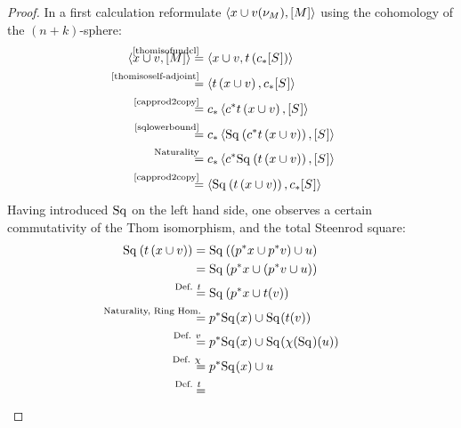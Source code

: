 \begin{Thm}
\begin{proof}
    
    In a first calculation reformulate
    $\left\langle x\cup v(\nu_{M}), [M] \right\rangle$ using the cohomology of the
    $(n+k)$-sphere:
    \begin{align}\notag
      \capped{x\cup \v}{\fundcl M}
      &\equalsby{\autoref{thomisofundcl}}
        \capped
        {x\cup\v}
        {\thomiso\left(\pf\collapse\fundcl{\Sphere{}}\right)}
      \\\notag
      &\equalsby{\autoref{thomisoself-adjoint}}
        \capped
        {\thomiso\left(x\cup\v\right)}
        {\pf\collapse\fundcl{\Sphere{}}}
      \\\notag
      &\equalsby{\autoref{capprod2copy}}
        \pf\collapse\capped
        {\pb\collapse\thomiso\left(x\cup\v\right)}
        {\fundcl{\Sphere{}}}
      \\\notag
      &\equalsby{\autoref{sqlowerbound}}
        \pf\collapse\capped
        {\Sq{}\left(\pb\collapse\thomiso\left(x\cup\v\right)\right)}
        {\fundcl{\Sphere{}}}
      \\\notag
      &\equalsby{Naturality}
        \pf\collapse\capped
        {\pb\collapse\Sq{}\left(\thomiso\left(x\cup\v\right)\right)}
        {\fundcl{\Sphere{}}}
      \\\label{proofaltdefwuclasses:eq1}
      &\equalsby{\autoref{capprod2copy}}
        \capped
        {\Sq{}\left(\thomiso\left(x\cup\v\right)\right)}
        {\pf\collapse\fundcl{\Sphere{}}}
    \end{align}
    Having introduced $\mathrm{Sq}^{}$ on the left hand side, one observes a
    certain commutativity of the Thom isomorphism, and the total
    Steenrod square:
    \begin{align}\notag
      \Sq{}\left(\thomiso\left(x\cup\v\right)\right)
      &=
        \Sq{}\left(\left(\pb p x\cup \pb p\v\right) \cup \u\right)
      \\\notag
      &=
        \Sq{}\left(\pb p x\cup \left(\pb p\v \cup \u\right)\right)
      \\\notag
      &\equalsby{Def. $\thomiso$}
       \Sq{}\left(\pb p x\cup \thomiso(\v)\right)
      \\\notag
      &\equalsby{Naturality, Ring Hom.}
        \pb p\Sq{}(x) \cup \Sq{}(\thomiso(\v))
      \\\notag
      &\equalsby{Def. $\v$}
        \pb p\Sq{}(x) \cup \Sq{}(\antipode(\Sq{})(u))
      \\\notag
      &\equalsby{Def. $\antipode$}
        \pb p\Sq{}(x) \cup u
      \\\label{proofaltdefwuclasses:eq2}
      &\equalsby{Def. $\thomiso$}

\end{align}
\end{proof}
\end{Thm}
